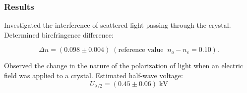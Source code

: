 \documentclass{beamer}
\begin{document}
	
\begin{frame}
	\frametitle{Results}
	Investigated the interference of scattered light passing through the crystal.
	Determined birefringence difference:
	
	 $$\Delta n = (0.098 \pm 0.004) \; (\text{reference value}\;\; n_o - n_e = 0.10).$$
	
	 Observed the change in the nature of the polarization of light when an electric field was applied to a crystal. Estimated half-wave voltage:
	 $$U_{\lambda/2} = (0.45 \pm 0.06) \;\text{kV}$$
	
\end{frame}

	
\end{document}
